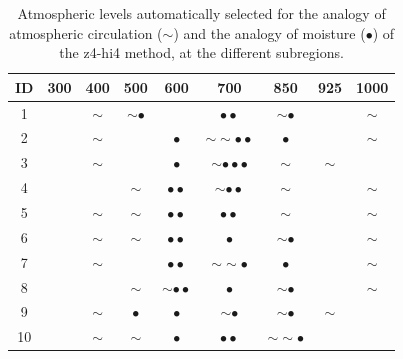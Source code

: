 \documentclass[twocol]{ametsoc}
\begin{document}
\begin{table}[htbp]
	\footnotesize
	\caption{Atmospheric levels automatically selected for the analogy of atmospheric circulation ($\sim$) and the analogy of moisture ($\bullet$) of the z4-hi4 method, at the different subregions.}
	\begin{center}
		\begin{tabular}{ccccccccc}
			\hline \textbf{ID} & \textbf{300} & \textbf{400} & \textbf{500} & \textbf{600} & \textbf{700} & \textbf{850} & \textbf{925} & \textbf{1000} \\ 
			\hline 
			1  &   & $\sim$ & $\sim \bullet$ &   & $\bullet \bullet$ & $\sim \bullet$ &   & $\sim$ \\
			2  &   & $\sim$ &   & $\bullet$ & $\sim \sim \bullet \bullet$ & $\bullet$ &   & $\sim$ \\
			3  &   & $\sim$ &   & $\bullet$ & $\sim \bullet \bullet \bullet$ & $\sim$ & $\sim$ &   \\
			4  &   &   & $\sim$ & $\bullet \bullet$ & $\sim \bullet \bullet$ & $\sim$ &   & $\sim$ \\
			5  &   & $\sim$ & $\sim$ & $\bullet \bullet$ & $\bullet \bullet$ & $\sim$ &   & $\sim$ \\
			6  &   & $\sim$ & $\sim$ & $\bullet \bullet$ & $\bullet$ & $\sim \bullet$ &   & $\sim$ \\
			7  &   & $\sim$ &   & $\bullet \bullet$ & $\sim \sim \bullet$ & $\bullet$ &   & $\sim$ \\
			8  &   &   & $\sim$ & $\sim \bullet \bullet$ & $\bullet$ & $\sim \bullet$ &   & $\sim$ \\
			9  &   & $\sim$ &  $\bullet$ & $\bullet$ & $\sim \bullet$ & $\sim \bullet$ & $\sim$ &   \\
			10 &   & $\sim$ & $\sim$ & $\bullet$ & $\bullet \bullet$ & $\sim \sim \bullet$ &   &   \\
			\hline 
		\end{tabular} 
	\end{center}
	\label{table:levels_GA_z4_hi4}
\end{table}
\end{document}
